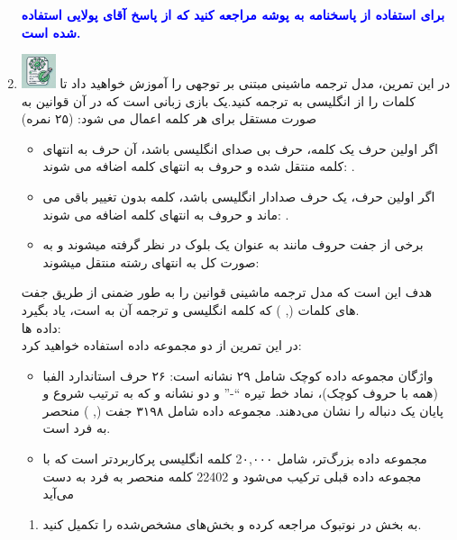 \documentclass[12pt]{article}
\begin{document}
\begin{enumerate}
\begin{enumerate}
    \end{enumerate}
    \textcolor{blue}{\textbf{برای استفاده از پاسخنامه به پوشه  مراجعه کنید که از پاسخ آقای پولایی استفاده شده است.}}
    \item \includegraphics[width=1cm]{figs/Allowed_with_contributino.jpg}
    در این تمرین، مدل ترجمه ماشینی مبتنی بر توجهی را آموزش خواهید داد تا کلمات را از انگلیسی به     ترجمه کنید.یک بازی زبانی است که در آن قوانین به صورت مستقل برای هر کلمه اعمال می    شود:    (۲۵ نمره)
    \begin{itemize}
        \item اگر اولین حرف یک کلمه، حرف بی صدای انگلیسی باشد، آن حرف به انتهای کلمه منتقل شده و حروف به انتهای کلمه اضافه می  شوند:  .
        \item  اگر اولین حرف، یک حرف صدادار انگلیسی باشد، کلمه بدون تغییر باقی می ماند و حروف  به انتهای کلمه اضافه می شوند: .
        \item برخی از جفت حروف مانند  به عنوان یک بلوک در نظر گرفته  میشوند و به صورت کل به انتهای رشته منتقل میشوند:
    \end{itemize}
    هدف این است که مدل ترجمه ماشینی قوانین را به طور ضمنی از طریق جفت های کلمات (, ) که   کلمه انگلیسی و  ترجمه آن به   است، یاد بگیرد.\\
    داده ها:\\
    در این تمرین از دو مجموعه داده استفاده خواهید کرد:\\
    \begin{itemize}
    \item واژگان مجموعه داده کوچک شامل ۲۹ نشانه است: ۲۶ حرف استاندارد الفبا (همه با حروف کوچک)، نماد خط تیره “-” و دو نشانه  و  که به ترتیب شروع و پایان یک دنباله را نشان می‌دهند. مجموعه داده شامل ۳۱۹۸ جفت (, ) منحصر به فرد است.
    \item مجموعه داده بزرگ‌تر، شامل 2۰,۰۰۰ کلمه انگلیسی پرکاربردتر است که با مجموعه داده قبلی ترکیب می‌شود و 22402 کلمه منحصر به فرد به دست می‌آید
    \end{itemize}
    \begin{enumerate}
    \item به بخش  در نوتبوک  مراجعه کرده و بخش‌های مشخص‌شده را تکمیل کنید.

\end{enumerate}
\end{enumerate}
\end{document}
